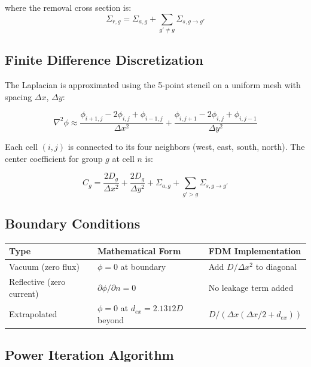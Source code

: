 \documentclass[12pt,a4paper]{article}
\begin{document}
where the removal cross section is:
\begin{equation}
    \Sigma_{r,g} = \Sigma_{a,g} + \sum_{g'\neq g} \Sigma_{s,g\to g'}
\end{equation}

\subsection{Finite Difference Discretization}

The Laplacian is approximated using the 5-point stencil on a uniform mesh
with spacing $\Delta x$, $\Delta y$:

\begin{equation}
    \nabla^2 \phi \approx
    \frac{\phi_{i+1,j} - 2\phi_{i,j} + \phi_{i-1,j}}{\Delta x^2}
    + \frac{\phi_{i,j+1} - 2\phi_{i,j} + \phi_{i,j-1}}{\Delta y^2}
\end{equation}

Each cell $(i,j)$ is connected to its four neighbors (west, east, south,
north). The center coefficient for group $g$ at cell $n$ is:

\begin{equation}
    C_g = \frac{2D_g}{\Delta x^2} + \frac{2D_g}{\Delta y^2}
          + \Sigma_{a,g} + \sum_{g'>g} \Sigma_{s,g\to g'}
\end{equation}

\subsection{Boundary Conditions}

\begin{center}
\begin{tabular}{lll}
\toprule
\textbf{Type} & \textbf{Mathematical Form} & \textbf{FDM Implementation} \\
\midrule
Vacuum (zero flux) & $\phi = 0$ at boundary & Add $D/\Delta x^2$ to diagonal \\
Reflective (zero current) & $\partial\phi/\partial n = 0$ & No leakage term added \\
Extrapolated & $\phi = 0$ at $d_{ex} = 2.1312D$ beyond & $D/(\Delta x(\Delta x/2 + d_{ex}))$ \\
\bottomrule
\end{tabular}
\end{center}

\subsection{Power Iteration Algorithm}
\end{document}
